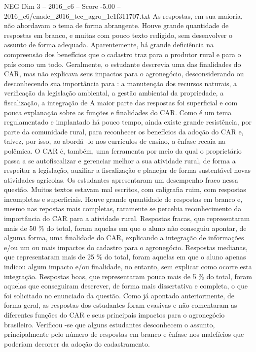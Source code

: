 \begin{textsample}{NEG Dim 3 – 2016\_c6 – Score -5.00 – 2016\_c6/enade\_2016\_tec\_agro\_1c1f311707.txt}
As respostas, em sua maioria, não abordavam o tema de forma abrangente.
Houve grande quantidade de respostas em branco, e muitas com pouco texto redigido, sem desenvolver o assunto de forma adequada.
Aparentemente, há grande deficiência na compreensão dos benefícios que o cadastro traz para o produtor rural e para o país como um todo.
Geralmente, o estudante descrevia uma das finalidades do CAR, mas não explicava seus impactos para o agronegócio, desconsiderando ou desconhecendo sua importância para : a manutenção dos recursos naturais, a verificação da legislação ambiental, a gestão ambiental da propriedade, a fiscalização, a integração de A maior parte das respostas foi superficial e com pouca explanação sobre as funções e finalidades do CAR.
Como é um tema regulamentado e implantado há pouco tempo, ainda existe grande resistência, por parte da comunidade rural, para reconhecer os benefícios da adoção do CAR e, talvez, por isso, ao abordá -lo nos currículos de ensino, a ênfase recaia na polêmica.
O CAR é, também, uma ferramenta por meio da qual o proprietário passa a se autofiscalizar e gerenciar melhor a sua atividade rural, de forma a respeitar a legislação, auxiliar a fiscalização e planejar de forma sustentável novas atividades agrícolas.
Os estudantes apresentaram um desempenho fraco nessa questão.
Muitos textos estavam mal escritos, com caligrafia ruim, com respostas incompletas e superficiais.
Houve grande quantidade de respostas em branco e, mesmo nas repostas mais completas, raramente se percebia reconhecimento da importância do CAR para a atividade rural.
Respostas fracas, que representaram mais de 50 \% do total, foram aquelas em que o aluno não conseguiu apontar, de alguma forma, uma finalidade do CAR, explicando a integração de informações e/ou um ou mais impactos do cadastro para o agronegócio.
Respostas medianas, que representaram mais de 25 \% do total, foram aquelas em que o aluno apenas indicou algum impacto e/ou finalidade, no entanto, sem explicar como ocorre esta integração.
Respostas boas, que representaram pouco mais de 5 \% do total, foram aquelas que conseguiram descrever, de forma mais dissertativa e completa, o que foi solicitado no enunciado da questão.
Como já apontado anteriormente, de forma geral, as respostas dos estudantes foram evasivas e não comentaram as diferentes funções do CAR e seus principais impactos para o agronegócio brasileiro.
Verificou -se que alguns estudantes desconhecem o assunto, principalmente pelo número de respostas em branco e ênfase nos malefícios que poderiam decorrer da adoção do cadastramento.

\end{textsample}
